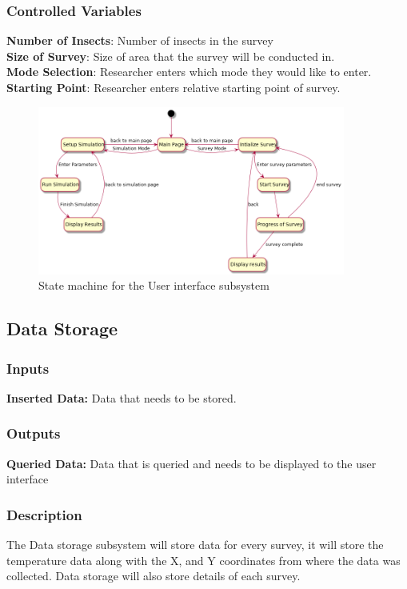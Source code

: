 \documentclass[11pt]{article}
\begin{document}
\subsubsection{Controlled Variables}
\textbf{Number of Insects}: Number of insects in the survey \\
\textbf{Size of Survey}: Size of area that the survey will be conducted in.\\
\textbf{Mode Selection}: Researcher enters which mode they would like to enter. \\
\textbf{Starting Point}: Researcher enters relative starting point of survey.

\begin{figure}[H]
   \centering
   \includegraphics[width=0.9\textwidth]{diagram/userint.png}
   \caption{State machine for the User interface subsystem}
   \label{fig:algorithm-fsm}
\end{figure}

\subsection{Data Storage}
\subsubsection{Inputs}
\textbf{Inserted Data:} Data that needs to be stored. 
\subsubsection{Outputs}
\textbf{Queried Data:} Data that is queried and needs to be displayed to the user interface
\subsubsection{Description}
The Data storage subsystem will store data for every survey, it will store the temperature data along with the X, and Y coordinates from where the data was collected. Data storage will also store details of each survey.
\end{document}

